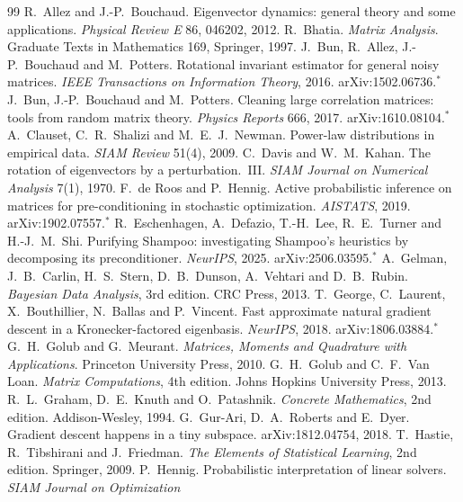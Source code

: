 \documentclass[11pt,a4paper]{article}
\theoremstyle{plain}
\theoremstyle{definition}
\theoremstyle{remark}
\begin{document}
\begin{thebibliography}{99}\setlength{\itemsep}{2pt}\small
{} R.~Allez and J.-P.~Bouchaud. Eigenvector dynamics: general theory and some applications.
  \emph{Physical Review E} 86, 046202, 2012.
 R.~Bhatia. \emph{Matrix Analysis}. Graduate Texts in Mathematics 169, Springer, 1997.
 J.~Bun, R.~Allez, J.-P.~Bouchaud and M.~Potters. Rotational invariant estimator for general noisy
  matrices. \emph{IEEE Transactions on Information Theory}, 2016. arXiv:1502.06736.$^*$
 J.~Bun, J.-P.~Bouchaud and M.~Potters. Cleaning large correlation matrices: tools from random matrix
  theory. \emph{Physics Reports} 666, 2017. arXiv:1610.08104.$^*$
 A.~Clauset, C.~R.~Shalizi and M.~E.~J.~Newman. Power-law distributions in empirical data.
  \emph{SIAM Review} 51(4), 2009.
 C.~Davis and W.~M.~Kahan. The rotation of eigenvectors by a perturbation.~III. \emph{SIAM Journal on
  Numerical Analysis} 7(1), 1970.
 F.~de Roos and P.~Hennig. Active probabilistic inference on matrices for pre-conditioning in
  stochastic optimization. \emph{AISTATS}, 2019. arXiv:1902.07557.$^*$
 R.~Eschenhagen, A.~Defazio, T.-H.~Lee, R.~E.~Turner and H.-J.~M.~Shi. Purifying Shampoo:
  investigating Shampoo's heuristics by decomposing its preconditioner. \emph{NeurIPS}, 2025. arXiv:2506.03595.$^*$
 A.~Gelman, J.~B.~Carlin, H.~S.~Stern, D.~B.~Dunson, A.~Vehtari and D.~B.~Rubin. \emph{Bayesian Data
  Analysis}, 3rd edition. CRC Press, 2013.
 T.~George, C.~Laurent, X.~Bouthillier, N.~Ballas and P.~Vincent. Fast approximate natural gradient
  descent in a Kronecker-factored eigenbasis. \emph{NeurIPS}, 2018. arXiv:1806.03884.$^*$
 G.~H.~Golub and G.~Meurant. \emph{Matrices, Moments and Quadrature with Applications}. Princeton
  University Press, 2010.
 G.~H.~Golub and C.~F.~Van Loan. \emph{Matrix Computations}, 4th edition. Johns Hopkins University
  Press, 2013.
 R.~L.~Graham, D.~E.~Knuth and O.~Patashnik. \emph{Concrete Mathematics}, 2nd edition. Addison-Wesley,
  1994.
 G.~Gur-Ari, D.~A.~Roberts and E.~Dyer. Gradient descent happens in a tiny subspace.
  arXiv:1812.04754, 2018.
 T.~Hastie, R.~Tibshirani and J.~Friedman. \emph{The Elements of Statistical Learning}, 2nd edition.
  Springer, 2009.
 P.~Hennig. Probabilistic interpretation of linear solvers. \emph{SIAM Journal on Optimization}

\end{thebibliography}
\end{document}
